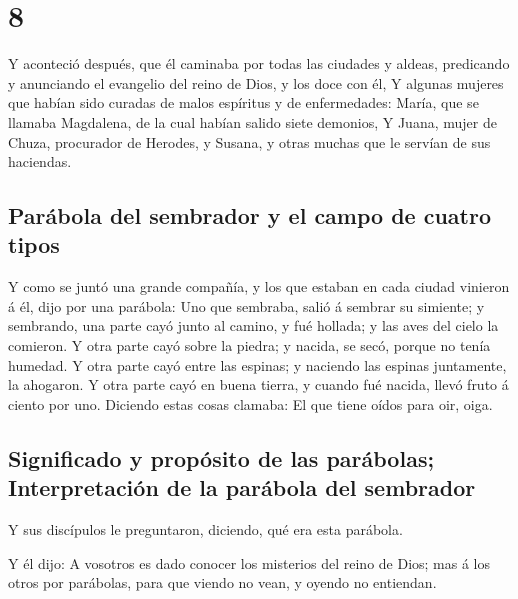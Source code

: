 \hypertarget{section-7}{%
\section{8}\label{section-7}}

 Y aconteció después, que él caminaba por todas las
ciudades y aldeas, predicando y anunciando el evangelio del reino de
Dios, y los doce con él,  Y algunas mujeres que habían
sido curadas de malos espíritus y de enfermedades: María, que se llamaba
Magdalena, de la cual habían salido siete demonios,  Y
Juana, mujer de Chuza, procurador de Herodes, y Susana, y otras muchas
que le servían de sus haciendas.

\hypertarget{paruxe1bola-del-sembrador-y-el-campo-de-cuatro-tipos}{%
\subsection{Parábola del sembrador y el campo de cuatro
tipos}\label{paruxe1bola-del-sembrador-y-el-campo-de-cuatro-tipos}}

 Y como se juntó una grande compañía, y los que estaban en
cada ciudad vinieron á él, dijo por una parábola:  Uno que
sembraba, salió á sembrar su simiente; y sembrando, una parte cayó junto
al camino, y fué hollada; y las aves del cielo la comieron.
 Y otra parte cayó sobre la piedra; y nacida, se secó,
porque no tenía humedad.  Y otra parte cayó entre las
espinas; y naciendo las espinas juntamente, la ahogaron. 
Y otra parte cayó en buena tierra, y cuando fué nacida, llevó fruto á
ciento por uno. Diciendo estas cosas clamaba: El que tiene oídos para
oir, oiga.

\hypertarget{significado-y-propuxf3sito-de-las-paruxe1bolas-interpretaciuxf3n-de-la-paruxe1bola-del-sembrador}{%
\subsection{Significado y propósito de las parábolas; Interpretación de
la parábola del
sembrador}\label{significado-y-propuxf3sito-de-las-paruxe1bolas-interpretaciuxf3n-de-la-paruxe1bola-del-sembrador}}

 Y sus discípulos le preguntaron, diciendo, qué era esta
parábola.

 Y él dijo: A vosotros es dado conocer los misterios del
reino de Dios; mas á los otros por parábolas, para que viendo no vean, y
oyendo no entiendan.

